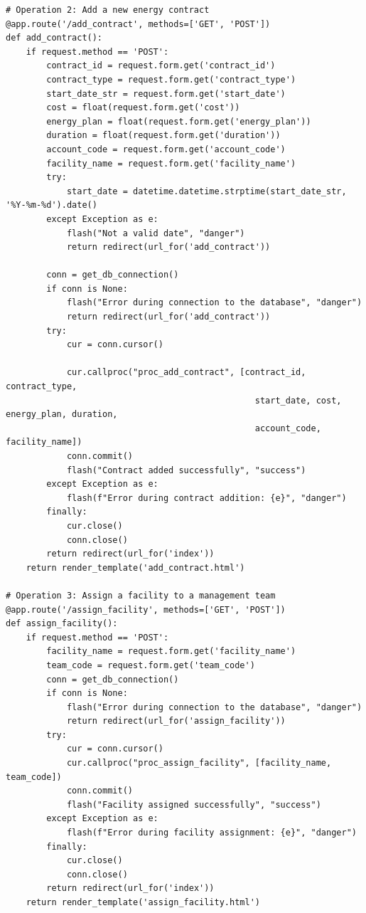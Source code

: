 \begin{lstlisting}
# Operation 2: Add a new energy contract
@app.route('/add_contract', methods=['GET', 'POST'])
def add_contract():
    if request.method == 'POST':
        contract_id = request.form.get('contract_id')
        contract_type = request.form.get('contract_type')
        start_date_str = request.form.get('start_date')
        cost = float(request.form.get('cost'))
        energy_plan = float(request.form.get('energy_plan'))
        duration = float(request.form.get('duration'))
        account_code = request.form.get('account_code')
        facility_name = request.form.get('facility_name')
        try:
            start_date = datetime.datetime.strptime(start_date_str, '%Y-%m-%d').date()
        except Exception as e:
            flash("Not a valid date", "danger")
            return redirect(url_for('add_contract'))

        conn = get_db_connection()
        if conn is None:
            flash("Error during connection to the database", "danger")
            return redirect(url_for('add_contract'))
        try:
            cur = conn.cursor()
           
            cur.callproc("proc_add_contract", [contract_id, contract_type,
                                                 start_date, cost, energy_plan, duration,
                                                 account_code, facility_name])
            conn.commit()
            flash("Contract added successfully", "success")
        except Exception as e:
            flash(f"Error during contract addition: {e}", "danger")
        finally:
            cur.close()
            conn.close()
        return redirect(url_for('index'))
    return render_template('add_contract.html')

# Operation 3: Assign a facility to a management team
@app.route('/assign_facility', methods=['GET', 'POST'])
def assign_facility():
    if request.method == 'POST':
        facility_name = request.form.get('facility_name')
        team_code = request.form.get('team_code')
        conn = get_db_connection()
        if conn is None:
            flash("Error during connection to the database", "danger")
            return redirect(url_for('assign_facility'))
        try:
            cur = conn.cursor()
            cur.callproc("proc_assign_facility", [facility_name, team_code])
            conn.commit()
            flash("Facility assigned successfully", "success")
        except Exception as e:
            flash(f"Error during facility assignment: {e}", "danger")
        finally:
            cur.close()
            conn.close()
        return redirect(url_for('index'))
    return render_template('assign_facility.html')


\end{lstlisting}
